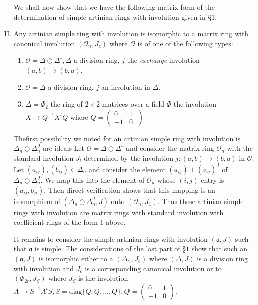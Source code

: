 \begin{enumerate}[I.]
We shall now show that we have the following matrix form of the determination of simple artinian rings with involution given in \S $1$.

\item Any artinian simple ring with involution is isomorphic to a matrix ring with canonical involution $(\mathscr{O}_n, J_c)$ where $\mathscr{O}$ is of one of the following types:
\begin{enumerate}[1.]
\item $\mathscr{O}=\Delta\oplus\Delta^{\circ},\Delta$ a division ring, $j$ the {\em exchange} involution $(a,b)\to(b,a)$.
\item $\mathscr{O}=\Delta$ a division ring, $j$ an involution in $\Delta$.
\item $\Delta=\Phi_2$ the ring of $2\times2$ matrices over a field $\Phi$ the involution $X\to Q^{-1} X^{t} Q$ where $Q=\begin{pmatrix}
0 & 1\\
-1 & 0.
\end{pmatrix}$
\end{enumerate}
The\pageoriginale first possibility we noted for an artinian simple ring with involution is $\Delta_n\oplus\Delta_n^{J}$ are ideals Let $\mathscr{O}=\Delta\oplus\Delta^{\circ}$ and consider the matrix ring $\mathscr{O}_n$ with the standard involution $J_{l}$  determined by the involution $j:(a,b)\to(b,a)$ in $\mathscr{O}$. Let $(a_{ij}),(b_{ij})\in \Delta_n$ and consider the element $(a_{ij})+(v_{ij})^{J}$ of $\Delta_n\oplus \Delta_n^{J}$. We map this into the element of $\mathscr{O}_n$ whose $(i,j)$ entry is $(a_{ij},b_{ji})$. Then direct verification shows that this mapping is an isomorphism of $(\Delta_n\oplus\Delta_n^{J}, J)$ onto $(\mathscr{O}_n, J_1)$. Thus these artinian simple rings with involution are matrix rings with standard involution with coefficient rings of the form $1$ above.

It remains to consider the simple artinian rings with involution $(\mathfrak{a},J )$ such that $\mathfrak{a}$ is simple. The considerations of the last part of \S $1$ show that such an $(\mathfrak{a},J)$ is isomorphic either to a $(\Delta_n, J_c)$ where $(\Delta, J)$ is a division ring with involution and $J_c$ is a corresponding canonical involution or to $(\Phi_{2r},J_{S})$ where $J_{S}$ is the involution $A\to S^{-1}A^{t} S, S=\text{diag}\{Q,Q,\ldots,Q\},Q=\begin{pmatrix}
0 & 1\\
-1 & 0
\end{pmatrix}.$


\end{enumerate}
